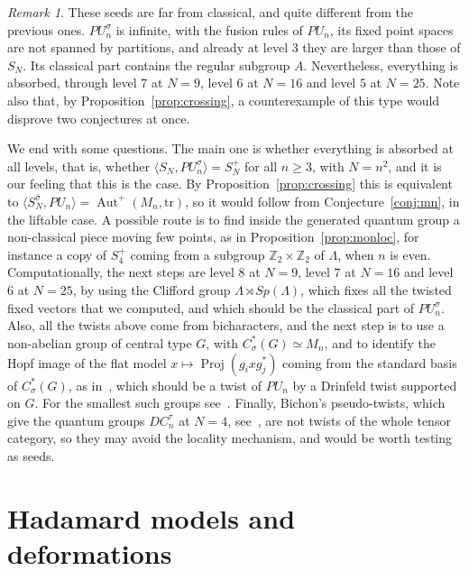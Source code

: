 \documentclass[11pt]{amsart}
\theoremstyle{definition}
\theoremstyle{remark}
\newtheorem{remark}[theorem]{Remark}
\theoremstyle{plain}
\numberwithin{equation}{section}
\numberwithin{table}{section}
\newcommand{\Z}{\mathbb Z}
\DeclareMathOperator{\Aut}{Aut}
\DeclareMathOperator{\Proj}{Proj}
\begin{document}
\begin{remark}
These seeds are far from classical, and quite different from the previous ones. $PU_n^\sigma$ is infinite, with the fusion rules of $PU_n$, its fixed point spaces are not spanned by partitions, and already at level $3$ they are larger than those of $S_N$. Its classical part contains the regular subgroup $A$. Nevertheless, everything is absorbed, through level $7$ at $N=9$, level $6$ at $N=16$ and level $5$ at $N=25$. Note also that, by Proposition~\ref{prop:crossing}, a counterexample of this type would disprove two conjectures at once.
\end{remark}

We end with some questions. The main one is whether everything is absorbed at all levels, that is, whether $\langle S_N,PU_n^\sigma\rangle=S_N^+$ for all $n\ge3$, with $N=n^2$, and it is our feeling that this is the case. By Proposition~\ref{prop:crossing} this is equivalent to $\langle S_N^{\bar\sigma},PU_n\rangle=\Aut^+(M_n,\mathrm{tr})$, so it would follow from Conjecture~\ref{conj:mn}, in the liftable case. A possible route is to find inside the generated quantum group a non-classical piece moving few points, as in Proposition~\ref{prop:monloc}, for instance a copy of $S_4^+$ coming from a subgroup $\Z_2\times\Z_2$ of $\Lambda$, when $n$ is even. Computationally, the next steps are level $8$ at $N=9$, level $7$ at $N=16$ and level $6$ at $N=25$, by using the Clifford group $\widehat\Lambda\rtimes Sp(\Lambda)$, which fixes all the twisted fixed vectors that we computed, and which should be the classical part of $PU_n^\sigma$. Also, all the twists above come from bicharacters, and the next step is to use a non-abelian group of central type $G$, with $C^*_\sigma(G)\simeq M_n$, and to identify the Hopf image of the flat model $x\mapsto\Proj(g_ixg_j^*)$ coming from the standard basis of $C^*_\sigma(G)$, as in~\cite[Thm.~2.8]{bn}, which should be a twist of $PU_n$ by a Drinfeld twist supported on $G$. For the smallest such groups see~\cite{bbn,eg,kr}. Finally, Bichon's pseudo-twists, which give the quantum groups $DC_n^\tau$ at $N=4$, see~\cite{bb}, are not twists of the whole tensor category, so they may avoid the locality mechanism, and would be worth testing as seeds.



\section{Hadamard models and deformations}\label{sec:hadamard}
\end{document}

